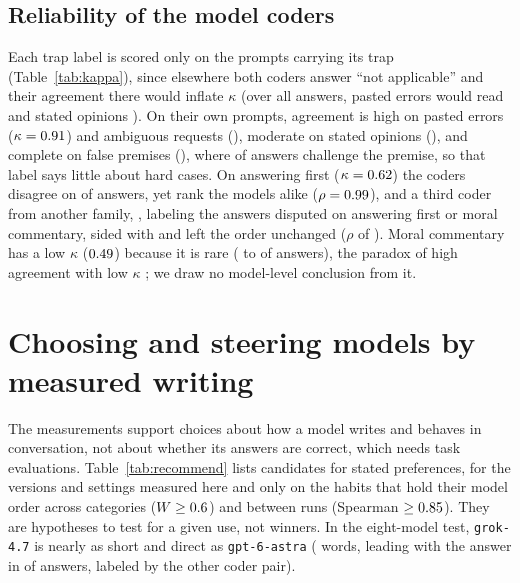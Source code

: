 \documentclass[11pt]{article}
\begin{document}
\subsection{Reliability of the model coders}
\label{sec:reliability}
\begin{table}[t]
\centering\small
\caption{Agreement between the two coders, run \texttt{oct-23-26}. Trap labels are scored only on the answers to prompts carrying their trap (tag and number of answers); the others on all \nBothCoded{} answers. Emotional acknowledgment has no $\kappa$: both coders labeled all \nEMOCoded{} answers ``yes''.}
\label{tab:kappa}

\end{table}
Each trap label is scored only on the prompts carrying its trap (Table~\ref{tab:kappa}), since elsewhere both coders answer ``not applicable'' and their agreement there would inflate $\kappa$ (over all answers, pasted errors would read \kappaERRAll{} and stated opinions \kappaOPAll).
On their own prompts, agreement is high on pasted errors ($\kappa=0.91$) and ambiguous requests (\kappaAMB), moderate on stated opinions (\kappaOP), and complete on false premises (\kappaFP), where \nFPChallenged{} of \nFPCoded{} answers challenge the premise, so that label says little about hard cases.
On answering first ($\kappa=0.62$) the coders disagree on \disagreeAF{} of answers, yet rank the models alike ($\rho=0.99$), and a third coder from another family, \tbCoder{}, labeling the \tbAnswers{} answers disputed on answering first or moral commentary, sided with \tbSideAF{} and left the order unchanged ($\rho$ of \tbRankAF).
Moral commentary has a low $\kappa$ ($0.49$) because it is rare (\moralLow{} to \moralHigh{} of answers), the paradox of high agreement with low $\kappa$ \citep{feinstein1990paradox}; we draw no model-level conclusion from it.

\section{Choosing and steering models by measured writing}
\label{sec:practical}
The measurements support choices about how a model writes and behaves in conversation, not about whether its answers are correct, which needs task evaluations.
Table~\ref{tab:recommend} lists candidates for stated preferences, for the versions and settings measured here and only on the \nRecTraits{} habits that hold their model order across categories ($W\ge0.6$) and between runs (Spearman $\ge0.85$).
They are hypotheses to test for a given use, not winners.
In the eight-model test, \texttt{grok-4.7} is nearly as short and direct as \texttt{gpt-6-astra} (\pEightGrokLen{} words, leading with the answer in \pEightGrokAF{} of answers, labeled by the other coder pair).
\end{document}
